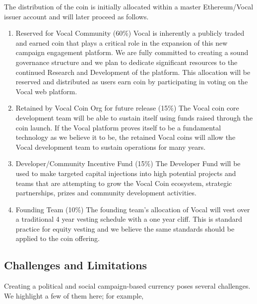 \documentclass[conference]{IEEEtran}
\begin{document}
    The distribution of the coin is initially allocated within a master Ethereum/Vocal issuer account and will later proceed as follows.

    \begin{enumerate}
        \item Reserved for Vocal Community (60\%)
       Vocal is inherently a publicly traded and earned coin that plays a critical role in the expansion of this new campaign engagement platform. We are fully committed to creating a sound governance structure and we plan to dedicate significant resources to the continued Research and Development of the platform. This allocation will be reserved and distributed as users earn coin by participating in voting on the Vocal web platform.
        \item Retained by Vocal Coin Org for future release (15\%)
        The Vocal coin core development team will be able to sustain itself using funds raised through the coin launch. If the Vocal platform proves itself to be a fundamental technology as we believe it to be, the retained Vocal coins will allow the Vocal development team to sustain operations for many years.
        \item Developer/Community Incentive Fund (15\%)
        The Developer Fund will be used to make targeted capital injections into high potential projects and teams that are attempting to grow the Vocal Coin ecosystem, strategic partnerships, prizes and community development activities.
        \item Founding Team (10\%)
        The founding team’s allocation of Vocal will vest over a traditional 4 year vesting schedule with a one year cliff. This is standard practice for equity vesting and we believe the same standards should be applied to the coin offering.
    \end{enumerate}
    


    \subsection{Challenges and Limitations}
    Creating a political and social campaign-based currency poses several challenges. We highlight a few of them here; for example,
\end{document}
